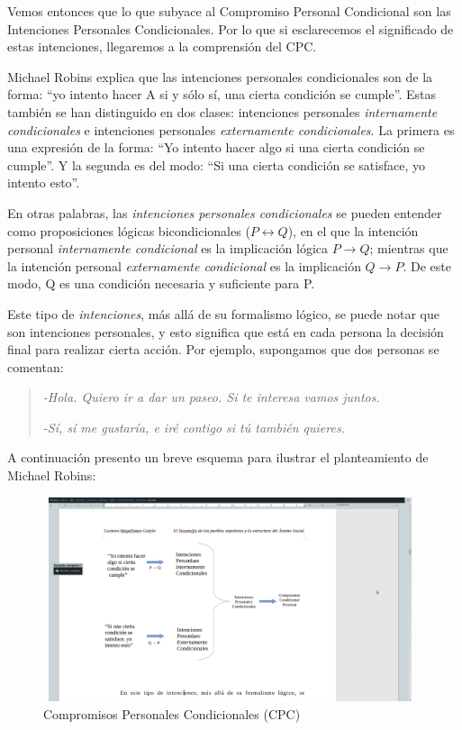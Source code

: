 \documentclass[oneside]{book}
\begin{document}
Vemos entonces que lo que subyace al Compromiso Personal Condicional son las Intenciones Personales Condicionales. Por lo que si esclarecemos el significado de estas intenciones, llegaremos a la comprensión  del CPC.

Michael Robins explica que las intenciones personales condicionales son de la forma: “yo intento hacer A si y sólo sí, una cierta condición se cumple”. Estas también se han distinguido en dos clases: intenciones personales \textit{internamente condicionales} e intenciones personales \textit{externamente condicionales}. La primera es una expresión de la forma: “Yo intento hacer algo si una cierta condición se cumple”. Y la segunda es del modo: “Si una cierta condición se satisface, yo intento esto”.

En otras palabras, las \textit{intenciones personales condicionales} se pueden entender como proposiciones lógicas bicondicionales ($P \leftrightarrow Q$), en el que la intención personal \textit{internamente condicional} es la implicación lógica  $P \rightarrow Q$; mientras que la intención personal \textit{externamente condicional} es la implicación $Q \rightarrow P$. De este modo, Q es una condición necesaria y suficiente para P.


Este tipo de \textit{intenciones}, más allá de su formalismo lógico, se puede notar que son intenciones personales, y esto significa que está en cada persona la decisión final para realizar cierta acción. Por ejemplo, supongamos que dos personas se comentan: 
\\


\begin{quote}

	\textit{-Hola. Quiero ir a dar un paseo. Si te interesa vamos juntos.}

	\textit{-Sí, sí me gustaría, e iré contigo si tú también quieres.}
\end{quote}

A continuación presento un breve esquema para ilustrar el planteamiento de Michael Robins:

\begin{figure}[h]
	\centering
	\includegraphics[width=11cm, height=6cm]{img/esquemaRobins}
	\caption{Compromisos Personales Condicionales (CPC)}
\end{figure}
\end{document}
